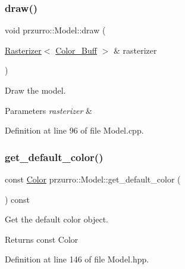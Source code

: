 \subsubsection{\texorpdfstring{draw()}{draw()}}
{\footnotesize\ttfamily void przurro\+::\+Model\+::draw (\begin{DoxyParamCaption}\item[{\mbox{\hyperlink{classprzurro_1_1_rasterizer}{Rasterizer}}$<$ \mbox{\hyperlink{classprzurro_1_1_color___buffer___rgba8888}{Color\+\_\+\+Buff}} $>$ \&}]{rasterizer }\end{DoxyParamCaption})}



Draw the model. 


\begin{DoxyParams}{Parameters}
{\em rasterizer} & \\
\hline
\end{DoxyParams}


Definition at line 96 of file Model.\+cpp.

\mbox{\label{classprzurro_1_1_model_a180104ec9701e878c0ada77b73356b13}} 
\subsubsection{\texorpdfstring{get\_default\_color()}{get\_default\_color()}}
{\footnotesize\ttfamily const \mbox{\hyperlink{structprzurro_1_1_color___buffer___rgba8888_1_1_color}{Color}} przurro\+::\+Model\+::get\+\_\+default\+\_\+color (\begin{DoxyParamCaption}{ }\end{DoxyParamCaption}) const\hspace{0.3cm}{\ttfamily [inline]}}



Get the default color object. 

\begin{DoxyReturn}{Returns}
const Color 
\end{DoxyReturn}


Definition at line 146 of file Model.\+hpp.

\mbox{\label{classprzurro_1_1_model_acd532e681ed5a48c5e1268419ea74905}} 
